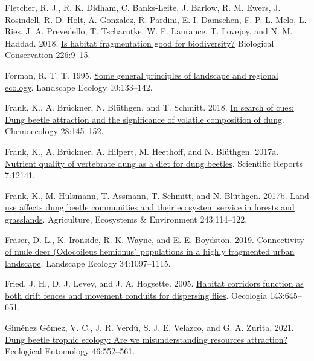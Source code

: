 \documentclass[
  man, donotrepeattitle]{apa6}
\newlength{\cslhangindent}
\newenvironment{CSLReferences}[2] %
 {\begin{list}{}{%
  \setlength{\itemindent}{0pt}
  \setlength{\leftmargin}{0pt}
  \setlength{\parsep}{0pt}
  \ifodd #1
   \setlength{\leftmargin}{\cslhangindent}
   \setlength{\itemindent}{-1\cslhangindent}
  \fi
  \setlength{\itemsep}{#2\baselineskip}}}
 {\end{list}}
\begin{document}
\begin{CSLReferences}{1}{0}
Fletcher, R. J., R. K. Didham, C. Banks-Leite, J. Barlow, R. M. Ewers, J. Rosindell, R. D. Holt, A. Gonzalez, R. Pardini, E. I. Damschen, F. P. L. Melo, L. Ries, J. A. Prevedello, T. Tscharntke, W. F. Laurance, T. Lovejoy, and N. M. Haddad. 2018. \href{https://doi.org/10.1016/j.biocon.2018.07.022}{Is habitat fragmentation good for biodiversity?} Biological Conservation 226:9--15.

Forman, R. T. T. 1995. \href{https://doi.org/10.1007/BF00133027}{Some general principles of landscape and regional ecology}. Landscape Ecology 10:133--142.

Frank, K., A. Brückner, N. Blüthgen, and T. Schmitt. 2018. \href{https://doi.org/10.1007/s00049-018-0266-4}{In search of cues: Dung beetle attraction and the significance of volatile composition of dung}. Chemoecology 28:145--152.

Frank, K., A. Brückner, A. Hilpert, M. Heethoff, and N. Blüthgen. 2017a. \href{https://doi.org/10.1038/s41598-017-12265-y}{Nutrient quality of vertebrate dung as a diet for dung beetles}. Scientific Reports 7:12141.

Frank, K., M. Hülsmann, T. Assmann, T. Schmitt, and N. Blüthgen. 2017b. \href{https://doi.org/10.1016/j.agee.2017.04.010}{Land use affects dung beetle communities and their ecosystem service in forests and grasslands}. Agriculture, Ecosystems \& Environment 243:114--122.

Fraser, D. L., K. Ironside, R. K. Wayne, and E. E. Boydston. 2019. \href{https://doi.org/10.1007/s10980-019-00824-9}{Connectivity of mule deer ({Odocoileus} hemionus) populations in a highly fragmented urban landscape}. Landscape Ecology 34:1097--1115.

Fried, J. H., D. J. Levey, and J. A. Hogsette. 2005. \href{https://doi.org/10.1007/s00442-005-0023-6}{Habitat corridors function as both drift fences and movement conduits for dispersing flies}. Oecologia 143:645--651.

Giménez Gómez, V. C., J. R. Verdú, S. J. E. Velazco, and G. A. Zurita. 2021. \href{https://doi.org/10.1111/een.13001}{Dung beetle trophic ecology: Are we misunderstanding resources attraction?} Ecological Entomology 46:552--561.


\end{CSLReferences}
\end{document}
